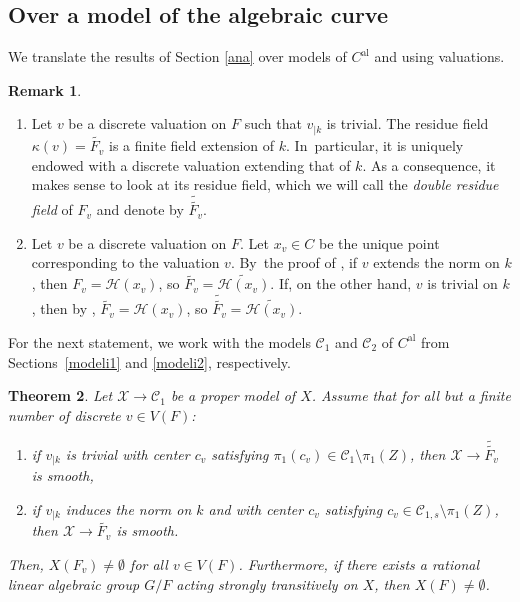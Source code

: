 \documentclass[JEP,XML,SOM,Unicode,NoFloatCountersInSection,published]{cedram}
\newcommand{\al}{\mathrm{al}}
\let\backslash\setminus
\newtheorem{thm}{Theorem}[section]
\theoremstyle{definition}
\newtheorem{rem}[thm]{Remark}
\begin{document}
\subsection{Over a model of the algebraic curve}
We translate the results of Section \ref{ana} over models of $C^{\al}$ and using valuations.

\skpt
\begin{rem} \label{3.4}
\begin{enumerate}
\item
Let $v$ be a discrete valuation on $F$ such that $v_{|k}$ is trivial. The residue field $\kappa(v)=\widetilde{F_v}$ is a finite field extension of $k$. In~particular, it is uniquely endowed with a discrete valuation extending that of $k$. As a consequence, it makes sense to look at its residue field, which we will call the \emph{double residue field} of $F_v$ and denote by $\widetilde{\widetilde{F_v}}$.

\item
Let $v$ be a discrete valuation on $F$. Let $x_v \in C$ be the unique point corresponding to the valuation $v$. By~the proof of \cite[Prop.\,3.15]{une}, if $v$ extends the norm on $k$, then $F_v =\mathcal{H}(x_v)$, so $\widetilde{F_v}=\widetilde{\mathcal{H}(x_v)}$. If, on the other hand, $v$ is trivial on $k$, then by \loccit, $\widetilde{F_v}=\mathcal{H}(x_v)$, so $\widetilde{\widetilde{F_v}}=\widetilde{\mathcal{H}(x_v)}$.
\end{enumerate}
\end{rem}

For the next statement, we work with the models $\mathscr{C}_1$ and $\mathscr{C}_2$ of $C^{\al}$ from Sections~\ref{modeli1} and \ref{modeli2}, respectively.

\begin{thm} \label{3.6}
Let $\mathcal{X} \to \mathscr{C}_1$ be a proper model of $X$. Assume that for all \emph{but a finite number} of discrete $v \in V(F)$:
\begin{enumerate}
\item if $v_{|k}$ is trivial with center $c_v$ satisfying $\pi_1(c_v) \in \mathscr{C}_1 \backslash \pi_1(Z)$, then $\mathcal{X} \to \widetilde{\widetilde{F_v}}$ is smooth,
\item if $v_{|k}$ induces the norm on $k$ and with center $c_v$ satisfying $c_v \in \mathscr{C}_{1,s} \backslash \pi_1(Z)$, then $\mathcal{X} \to \widetilde{F_v}$ is smooth.
\end{enumerate}
Then, $X(F_v) \neq \emptyset$ for all $v \in V(F)$.
Furthermore, if there exists a rational linear algebraic group $G/F$ acting strongly transitively on $X$, then $X(F) \neq \emptyset$.
\end{thm}
\end{document}
